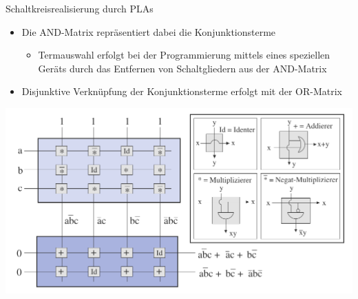 \documentclass[12pt%
,xcolor=table
,aspectratio=169%
]{beamer}
\begin{document}
\begin{frame}{Schaltkreisrealisierung durch PLAs}
\begin{itemize}
	\item Die AND-Matrix repräsentiert dabei die Konjunktionsterme
	\begin{itemize}
		\item Termauswahl erfolgt bei der Programmierung mittels eines speziellen Geräts durch das Entfernen von Schaltgliedern aus der AND-Matrix
	\end{itemize}		
	 \item Disjunktive Verknüpfung der Konjunktionsterme erfolgt mit der OR-Matrix
\end{itemize}
\begin{center}
\includegraphics[scale=0.275]{pictures/pla_schaltung}
\end{center}
\end{frame}
\end{document}

